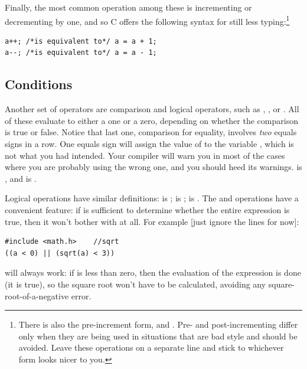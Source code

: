 Finally, the most common operation among these is incrementing or decrementing by one, and so C offers the
following syntax for still less typing:\footnote{There is also the pre-increment form,  and
. Pre- and post-incrementing differ only when they are being used in situations that are bad style and should
be avoided. Leave these operations on a separate line and stick to whichever form looks nicer to you.} \\
\begin{lstlisting}
a++; /*is equivalent to*/ a = a + 1;
a--; /*is equivalent to*/ a = a - 1;
\end{lstlisting}



\subsection{Conditions} 	
\label{forloops}    
 \cindex{>} \cindex{==}
Another set of operators are comparison and logical operators, such as ,
, or . All of these evaluate to either a one or a zero, depending on whether the
comparison is true or false. Notice that last one, comparison for equality, involves {\sl two} equals
signs in a row. One equals sign  will assign the value of  to the variable , which is not what
you had intended. Your compiler will warn you in most of the cases where you are
probably using the wrong one, and you should heed its warnings.  is , and  is .

Logical operations have similar definitions: \cindex{\&\&}  
  
 is ;  is ;  is .
The \ci{\&\&} and \ci{||} operations have a convenient feature: if  is sufficient to determine whether
the entire expression is true, then it won't bother with  at all. For example [just ignore the  lines for now]:
\begin{lstlisting}
#include <math.h>    //sqrt
((a < 0) || (sqrt(a) < 3))
\end{lstlisting}
will always work: if  is less than zero, then the evaluation
of the expression is done (it is true), so the square root won't have
to be calculated, avoiding any square-root-of-a-negative error. 

